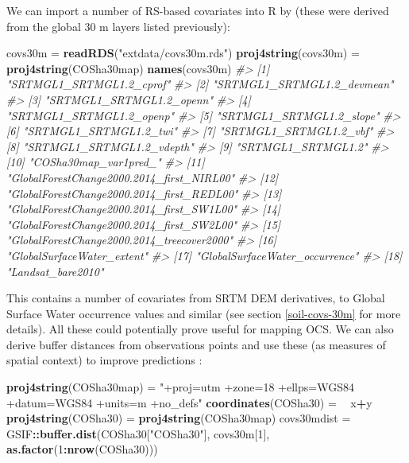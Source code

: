 \documentclass[graybox,natbib,nospthms,UStrade]{svmono}
\newenvironment{Shaded}{\begin{snugshade}}{\end{snugshade}}
\newcommand{\CommentTok}[1]{\textcolor[rgb]{0.37,0.37,0.37}{\textit{#1}}}
\newcommand{\DecValTok}[1]{\textcolor[rgb]{0.06,0.06,0.06}{#1}}
\newcommand{\ErrorTok}[1]{\textcolor[rgb]{0.14,0.14,0.14}{\textbf{#1}}}
\newcommand{\KeywordTok}[1]{\textcolor[rgb]{0.27,0.27,0.27}{\textbf{#1}}}
\newcommand{\NormalTok}[1]{#1}
\newcommand{\OperatorTok}[1]{\textcolor[rgb]{0.43,0.43,0.43}{\textbf{#1}}}
\newcommand{\StringTok}[1]{\textcolor[rgb]{0.5,0.5,0.5}{#1}}
\begin{document}
We can import a number of RS-based covariates into R by (these were derived from the global 30 m layers listed previously):

\begin{Shaded}
\begin{Highlighting}[]
\NormalTok{covs30m =}\StringTok{ }\KeywordTok{readRDS}\NormalTok{(}\StringTok{"extdata/covs30m.rds"}\NormalTok{)}
\KeywordTok{proj4string}\NormalTok{(covs30m) =}\StringTok{ }\KeywordTok{proj4string}\NormalTok{(COSha30map)}
\KeywordTok{names}\NormalTok{(covs30m)}
\CommentTok{#>  [1] "SRTMGL1_SRTMGL1.2_cprof"                  }
\CommentTok{#>  [2] "SRTMGL1_SRTMGL1.2_devmean"                }
\CommentTok{#>  [3] "SRTMGL1_SRTMGL1.2_openn"                  }
\CommentTok{#>  [4] "SRTMGL1_SRTMGL1.2_openp"                  }
\CommentTok{#>  [5] "SRTMGL1_SRTMGL1.2_slope"                  }
\CommentTok{#>  [6] "SRTMGL1_SRTMGL1.2_twi"                    }
\CommentTok{#>  [7] "SRTMGL1_SRTMGL1.2_vbf"                    }
\CommentTok{#>  [8] "SRTMGL1_SRTMGL1.2_vdepth"                 }
\CommentTok{#>  [9] "SRTMGL1_SRTMGL1.2"                        }
\CommentTok{#> [10] "COSha30map_var1pred_"                     }
\CommentTok{#> [11] "GlobalForestChange2000.2014_first_NIRL00" }
\CommentTok{#> [12] "GlobalForestChange2000.2014_first_REDL00" }
\CommentTok{#> [13] "GlobalForestChange2000.2014_first_SW1L00" }
\CommentTok{#> [14] "GlobalForestChange2000.2014_first_SW2L00" }
\CommentTok{#> [15] "GlobalForestChange2000.2014_treecover2000"}
\CommentTok{#> [16] "GlobalSurfaceWater_extent"                }
\CommentTok{#> [17] "GlobalSurfaceWater_occurrence"            }
\CommentTok{#> [18] "Landsat_bare2010"}
\end{Highlighting}
\end{Shaded}

This contains a number of covariates from SRTM DEM derivatives, to Global Surface Water occurrence values and similar (see section \ref{soil-covs-30m} for more details). All these could potentially prove useful for mapping OCS. We can also derive buffer distances from observations points and use these (as measures of spatial context) to improve predictions \citep{Hengl2018RFsp}:

\begin{Shaded}
\begin{Highlighting}[]
\KeywordTok{proj4string}\NormalTok{(COSha30map) =}\StringTok{ "+proj=utm +zone=18 +ellps=WGS84 +datum=WGS84 +units=m +no_defs"}
\KeywordTok{coordinates}\NormalTok{(COSha30) =}\StringTok{ }\ErrorTok{~}\StringTok{ }\NormalTok{x}\OperatorTok{+}\NormalTok{y}
\KeywordTok{proj4string}\NormalTok{(COSha30) =}\StringTok{ }\KeywordTok{proj4string}\NormalTok{(COSha30map)}
\NormalTok{covs30mdist =}\StringTok{ }\NormalTok{GSIF}\OperatorTok{::}\KeywordTok{buffer.dist}\NormalTok{(COSha30[}\StringTok{"COSha30"}\NormalTok{], covs30m[}\DecValTok{1}\NormalTok{], }\KeywordTok{as.factor}\NormalTok{(}\DecValTok{1}\OperatorTok{:}\KeywordTok{nrow}\NormalTok{(COSha30)))}
\end{Highlighting}
\end{Shaded}
\end{document}
